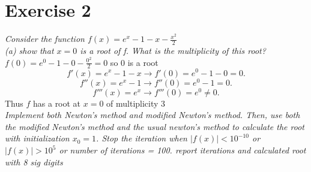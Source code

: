 \documentclass{amsart}
\begin{document}
    \section{Exercise 2}
    \emph{
        Consider the function $f(x) = e^{x} - 1 - x-\frac{x^2}{2}$ \\
    (a) show that $x=0$ is a root of  f. What is the multiplicity of this root?}\\
        $f(0) = e^{0} - 1 - 0 - \frac{0^2}{2} = 0$ so $0$ is a root
        \[
        f'(x) = e^{x} -1 - x \rightarrow f'(0) = e^{0} -1 -0 = 0
        .\] 
        \[
        f''(x) = e^{x} - 1 \rightarrow f''(0) = e^{0} - 1 = 0
        .\] 
        \[
        f'''(x) = e^{x} \rightarrow f'''(0) = e^{0} \ne 0
        .\] 
        Thus $f$ has a root at $x=0$ of multiplicity  3\\
    \emph{
        Implement both Newton's method and modified Newton's method. Then, use both the modified
        Newton's method and the usual newton's method to calculate the root with
        initialization $x_0 = 1$. Stop the iteration when $|f(x)| < 10^{-10}$ or $|f(x)| > 10^{5}$ 
        or number of iterations = 100. report iterations and calculated root with 8 sig digits
    }
\end{document}
